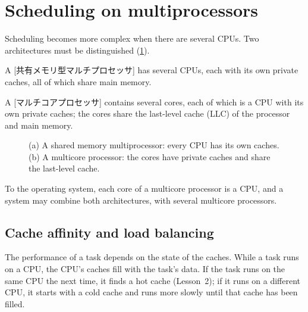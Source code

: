\documentclass[../main.tex]{subfiles}
\begin{document}
\section{Scheduling on multiprocessors}
\label{sec:l07-multi}

Scheduling becomes more complex when there are several
CPUs.  Two architectures must be distinguished
(\cref{fig:l07-multicpu}).

\begin{definition}
  A [共有メモリ型マルチプロセッサ] has
  several CPUs, each with its own private caches, all of which share main
  memory.
\end{definition}

\begin{definition}
  A [マルチコアプロセッサ] contains several
  cores, each of which is a CPU with its own private caches; the cores
  share the last-level cache (LLC) of the processor and main memory.
\end{definition}

\begin{figure}[htbp]
  \centering
  
  \caption{(a) A shared memory multiprocessor: every CPU has its own
    caches.  (b) A multicore processor: the cores have private caches and
    share the last-level cache.}
  \label{fig:l07-multicpu}
\end{figure}

To the operating system, each core of a multicore processor is a CPU, and a
system may combine both architectures, with several multicore processors.

\subsection{Cache affinity and load balancing}

The performance of a task depends on the state of the caches.  While a task
runs on a CPU, the CPU's caches fill with the task's data.  If the task
runs on the same CPU the next time, it finds a hot cache (Lesson~2); if it
runs on a different CPU, it starts with a cold cache and runs more slowly
until that cache has been filled.
\end{document}
